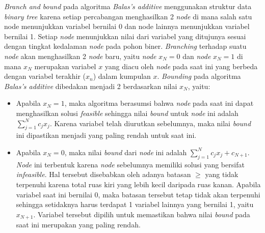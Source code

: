 \textit{Branch and bound} pada algoritma \textit{Balas's additive} menggunakan struktur data \textit{binary tree} karena setiap percabangan menghasilkan 2 \textit{node} di mana salah satu node menunjukkan variabel bernilai 0 dan node lainnya menunjukkan variabel bernilai 1. Setiap \textit{node} menunjukkan nilai dari variabel yang ditujunya sesuai dengan tingkat kedalaman \textit{node} pada pohon biner. \textit{Branching} terhadap suatu \textit{node} akan menghasilkan 2 \textit{node} baru, yaitu \textit{node} \(x_N=0\) dan \textit{node} \(x_N=1\) di mana \(x_N\) merupakan variabel \(x\) yang diacu oleh \textit{node} pada saat ini yang berbeda dengan variabel terakhir (\(x_n\)) dalam kumpulan \(x\). \textit{Bounding} pada algoritma \textit{Balas's additive} dibedakan menjadi 2 berdasarkan nilai \(x_N\), yaitu:

\begin{itemize}
	\item Apabila \(x_N = 1\), maka algoritma berasumsi bahwa \textit{node} pada saat ini dapat menghasilkan solusi \textit{feasible} sehingga nilai \textit{bound} untuk \textit{node} ini adalah \(\sum_{j=1}^{N} c_j x_j\). Karena variabel telah diurutkan sebelumnya, maka nilai \textit{bound} ini dipastikan menjadi yang paling rendah untuk saat ini.
	
	\item Apabila \(x_N = 0\), maka nilai \textit{bound} dari \textit{node} ini adalah \(\sum_{j=1}^{N} c_j x_j + c_{N+1}\). \textit{Node} ini terbentuk karena \textit{node} sebelumnya memiliki solusi yang bersifat \textit{infeasible}. Hal tersebut disebabkan oleh adanya batasan \(\geq\) yang tidak terpenuhi karena total ruas kiri yang lebih kecil daripada ruas kanan. Apabila variabel saat ini bernilai 0, maka batasan tersebut tetap tidak akan terpenuhi sehingga setidaknya harus terdapat 1 variabel lainnya yang bernilai 1, yaitu \(x_{N+1}\). Variabel tersebut dipilih untuk memastikan bahwa nilai \textit{bound} pada saat ini merupakan yang paling rendah.
\end{itemize}

